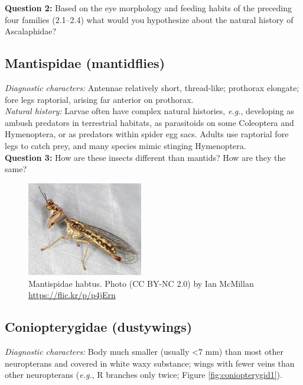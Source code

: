 \documentclass[letterpaper, 11pt]{article}
\begin{document}
\noindent{}\textbf{Question 2:} Based on the eye morphology and feeding habits of the preceding four families (2.1--2.4) what would you hypothesize about the natural history of Ascalaphidae?

\subsection{Mantispidae (mantidflies)}
\noindent{}\textit{Diagnostic characters:} Antennae relatively short, thread-like; prothorax elongate; fore legs raptorial, arising far anterior on prothorax.\\

\noindent{}\textit{Natural history:} Larvae often have complex natural histories, \textit{e.g.}, developing as ambush predators in terrestrial habitats, as parasitoids on some Coleoptera and Hymenoptera, or as predators within spider egg sacs. Adults use raptorial fore legs to catch prey, and many species mimic stinging Hymenoptera.\\

\noindent{}\textbf{Question 3:} How are these insects different than mantids? How are they the same?

\begin{figure}[ht!]
  \centering
    \includegraphics[width=0.45\textwidth]{MantispidHabitus}
  \caption{Mantispidae habtus. Photo (CC BY-NC 2.0) by Ian McMillan \url{https://flic.kr/p/p4jErn}}
  \label{fig:mantispid}
\end{figure}

\subsection{Coniopterygidae (dustywings)}
\noindent{}\textit{Diagnostic characters:} Body much smaller (usually \textless7 mm) than most other neuropterans and covered in white waxy substance; wings with fewer veins than other neuropterans (\textit{e.g.}, R branches only twice; Figure \ref{fig:coniopterygid1}).\\
\end{document}
